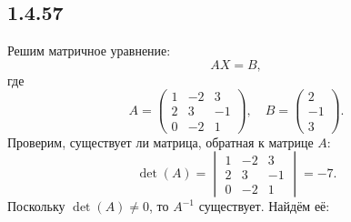 \subsection{1.4.57}

Решим матричное уравнение:
\[
AX=B,
\]
где
\[
A=
\begin{pmatrix}
	1 & -2 & 3 \\
	2 & 3 & -1 \\
	0 & -2 & 1
\end{pmatrix}
,\quad B=
\begin{pmatrix}
	2 \\
	-1 \\
	3
\end{pmatrix}.
\]
Проверим, существует ли матрица, обратная к матрице $A$:
\[
\det(A)=
\begin{vmatrix}
	1 & -2 & 3 \\
	2 & 3 & -1 \\
	0 & -2 & 1
\end{vmatrix}
=-7.
\]
Поскольку $\det(A)\neq0$, то $A^{-1}$ существует. Найдём её:
